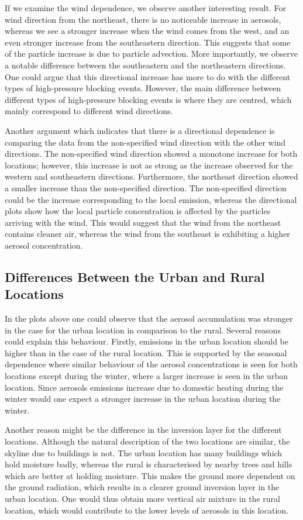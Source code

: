 If we examine the wind dependence, we observe another interesting result. For wind direction from the northeast, there is no noticeable increase in aerosols, whereas we see a stronger increase when the wind comes from the west, and an even stronger increase from the southeastern direction. This suggests that some of the particle increase is due to particle advection. More importantly, we observe a notable difference between the southeastern and the northeastern directions. One could argue that this directional increase has more to do with the different types of high-pressure blocking events. However, the main difference between different types of high-pressure blocking events is where they are centred, which mainly correspond to different wind directions. 

Another argument which indicates that there is a directional dependence is comparing the data from the non-specified wind direction with the other wind directions. The non-specified wind direction showed a monotone increase for both locations; however, this increase is not as strong as the increase observed for the western and southeastern directions. Furthermore, the northeast direction showed a smaller increase than the non-specified direction. The non-specified direction could be the increase corresponding to the local emission, whereas the directional plots show how the local particle concentration is affected by the particles arriving with the wind. This would suggest that the wind from the northeast contains cleaner air, whereas the wind from the southeast is exhibiting a higher aerosol concentration. 

\subsection{Differences Between the Urban and Rural Locations}
In the plots above one could observe that the aerosol accumulation was stronger in the case for the urban location in comparison to the rural. Several reasons could explain this behaviour. Firstly, emissions in the urban location should be higher than in the case of the rural location. This is supported by the seasonal dependence where similar behaviour of the aerosol concentrations is seen for both locations except during the winter, where a larger increase is seen in the urban location. Since aerosols emissions increase due to domestic heating during the winter would one expect a stronger increase in the urban location during the winter. 

Another reason might be the difference in the inversion layer for the different locations. Although the natural description of the two locations are similar, the skyline due to buildings is not. The urban location has many buildings which hold moisture badly, whereas the rural is characterised by nearby trees and hills which are better at holding moisture. This makes the ground more dependent on the ground radiation, which results in a clearer ground inversion layer in the urban location. One would thus obtain more vertical air mixture in the rural location, which would contribute to the lower levels of aerosols in this location. 

